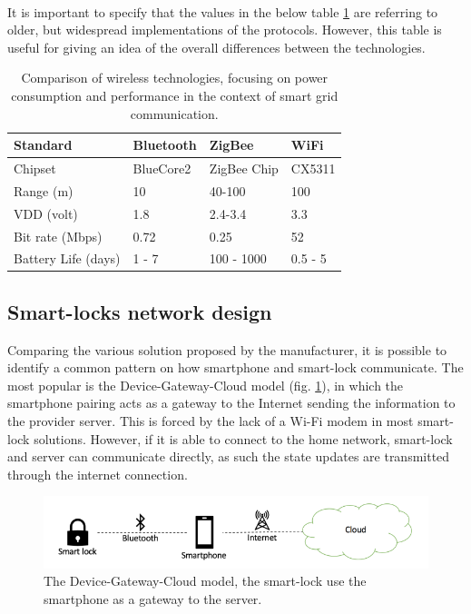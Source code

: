 \\ It is important to specify that the values in the below table \ref{tab:wireless-compare} are referring to older, but widespread implementations of the protocols. However, this table is useful for giving an idea of the overall differences between the technologies. 

\begin{table}[ht]
\def\arraystretch{1.75}
\begin{tabular}{|l|lll|}
\hline
Standard            & Bluetooth & ZigBee      & WiFi    \\
\hline
\hline
Chipset             & BlueCore2 & ZigBee Chip & CX5311  \\
\hline
Range (m)           & 10        & 40-100      & 100     \\
\hline
VDD (volt)          & 1.8       & 2.4-3.4     & 3.3     \\
\hline
Bit rate (Mbps)     & 0.72      & 0.25        & 52      \\
\hline
Battery Life (days) & 1 - 7     & 100 - 1000  & 0.5 - 5 \\ [1ex] 
 \hline
\end{tabular}
\caption{Comparison of wireless technologies, focusing on power consumption and performance in the context of smart grid communication. \cite{7030564}}
\label{tab:wireless-compare}
\end{table}

\subsection{Smart-locks network design}
\label{sec:dgcsmartlocks}
Comparing the various solution proposed by the manufacturer, it is possible to identify a common pattern on how smartphone and smart-lock communicate. The most popular is the Device-Gateway-Cloud model \cite{10.1145/2897845.2897886} (fig. \ref{fig:dgc}), in which the smartphone pairing acts as a gateway to the Internet sending the information to the provider server. This is forced by the lack of a Wi-Fi modem in most smart-lock solutions. However, if it is able to connect to the home network, smart-lock and server can communicate directly, as such the state updates are transmitted through the internet connection. 

\begin{figure}[ht]
    \centering
    \includegraphics[width=\textwidth]{figures/dgc.png}
    \caption{The Device-Gateway-Cloud model, the smart-lock use the smartphone as a gateway to the server.}
    \label{fig:dgc}
\end{figure}

